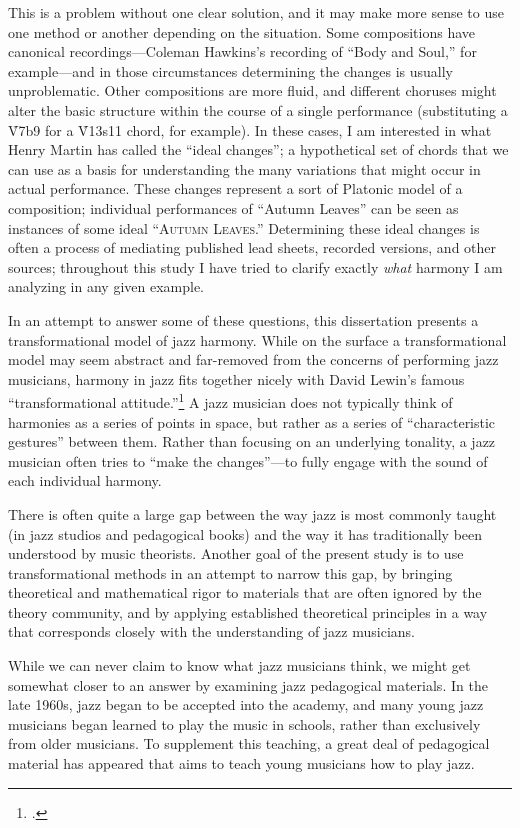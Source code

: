 \documentclass[diss]{subfiles}
\begin{document}
This is a problem without one clear solution, and it may make more sense to
use one method or another depending on the situation. Some compositions have
canonical recordings---Coleman Hawkins’s recording of “Body and Soul,” for
example---and in those circumstances determining the changes is usually
unproblematic. Other compositions are more fluid, and different choruses might
alter the basic structure within the course of a single performance
(substituting a \h{V7b9} for a \h{V13s11} chord, for example). In these
cases, I am interested in what Henry Martin has called the “ideal changes”; a
hypothetical set of chords that we can use as a basis for understanding the
many variations that might occur in actual performance. These
changes represent a sort of Platonic model of a composition; individual
performances of “Autumn Leaves” can be seen as instances of some ideal
“\textsc{Autumn Leaves}.” Determining these ideal changes is often a process
of mediating published lead sheets, recorded versions, and other sources;
throughout this study I have tried to clarify exactly \emph{what} harmony I am
analyzing in any given example.

In an attempt to answer some of these questions, this dissertation presents a
transformational model of jazz harmony. While on the surface a
transformational model may seem abstract and far-removed from the concerns of
performing jazz musicians, harmony in jazz fits together nicely with David
Lewin’s famous “transformational attitude.”\footcite[][159 (hereafter
\emph{GMIT)}]{lewin:gmit} A jazz
musician does not typically think of harmonies as a series of points in space,
but rather as a series of “characteristic gestures” between them. Rather than
focusing on an underlying tonality, a jazz musician often tries to “make the
changes”---to fully engage with the sound of each individual harmony.

There is often quite a large gap between the way jazz is most commonly taught
(in jazz studios and pedagogical books) and the way it has traditionally been
understood by music theorists. Another goal of the present study is to use
transformational methods in an attempt to narrow this gap, by bringing
theoretical and mathematical rigor to materials that are often ignored by the
theory community, and by applying established theoretical principles in a way
that corresponds closely with the understanding of jazz musicians.

While we can never claim to know what jazz musicians think, we might get
somewhat closer to an answer by examining jazz pedagogical materials. In the
late 1960s, jazz began to be accepted into the academy, and many young jazz
musicians began learned to play the music in schools, rather than exclusively
from older musicians. To supplement this teaching, a great deal of
pedagogical material has appeared that aims to teach young musicians how to
play jazz.
\end{document}

